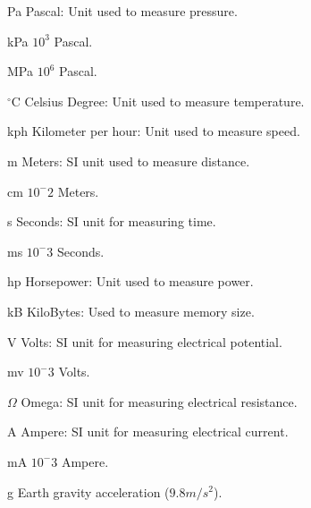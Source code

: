\begin{simbolos}
	\item[Pa] Pascal: Unit used to measure pressure.
	\item[kPa] $10^3$ Pascal.
	\item[MPa] $10^6$ Pascal.
	\item[$^{\circ}$C] Celsius Degree: Unit used to measure temperature.
	\item[kph] Kilometer per hour: Unit used to measure speed.
	\item[m] Meters: SI unit used to measure distance.
	\item[cm] $10^-2$ Meters.
	\item[s] Seconds: SI unit for measuring time.
	\item[ms] $10^-3$ Seconds.
	\item[hp] Horsepower: Unit used to measure power.
	\item[kB] KiloBytes: Used to measure memory size.
	\item[V] Volts: SI unit for measuring electrical potential.
	\item[mv]  $10^-3$ Volts.
	\item[$\Omega$] Omega: SI unit for measuring electrical resistance.
	\item[A] Ampere: SI unit for measuring electrical current.
	\item[mA]  $10^-3$ Ampere.
	\item[g] Earth gravity acceleration ($9.8m/s^2$).
\end{simbolos}